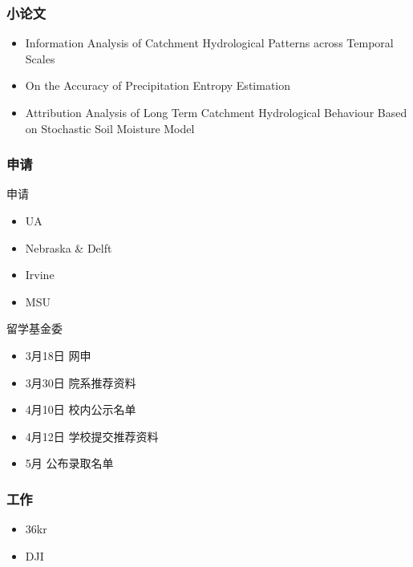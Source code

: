 \documentclass{beamer}
\begin{document}
\begin{CJK}{UTF8}{gkai}
\begin{frame}
\frametitle{小论文}
\begin{itemize}
\item Information Analysis of Catchment Hydrological Patterns across Temporal Scales
\item On the Accuracy of Precipitation Entropy Estimation
\item Attribution Analysis of Long Term Catchment Hydrological Behaviour Based on Stochastic Soil Moisture Model
\end{itemize}
\end{frame}

\begin{frame}
\frametitle{申请}
申请
\begin{itemize}
\item UA
\item Nebraska \& Delft
\item Irvine
\item MSU
\end{itemize}
留学基金委
\begin{itemize}
\item  3月18日 网申
\item  3月30日 院系推荐资料
\item 4月10日 校内公示名单
\item 4月12日 学校提交推荐资料
\item 5月 公布录取名单
\end{itemize}
\end{frame}

\begin{frame}
\frametitle{工作}
\begin{itemize}
\item 36kr
\item DJI
\end{itemize}
\end{frame} 

\end{CJK}
\end{document}
